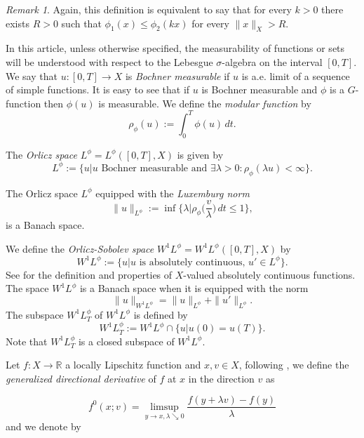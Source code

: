 \documentclass[twoside]{article}
\theoremstyle{definition}
\theoremstyle{plain}
\theoremstyle{remark}
\newtheorem{remark}{Remark}[section]
\newcommand{\orlnor}{\|_{L^{\phi}}}
\newcommand{\lphi}{L^{\phi}}
\newcommand{\wphi}{W^{1}\lphi}
\newcommand{\wphit}{W^{1}\lphi_T}
\newcommand{\rr}{\mathbb{R}}
\begin{document}
\begin{remark} Again, this definition is equivalent to say that for every $k>0$ there exists $R>0$ such that $\phi_1(x)\leq\phi_2(kx)$ for every $\|x\|_X>R$. 
\end{remark}




In this article, unless otherwise specified, the measurability of functions or sets will be understood with respect to the Lebesgue $\sigma$-algebra on the interval $[0, T]$. We say that $u:[0,T]\to X$ is \emph{Bochner measurable} if $u$ is a.e. limit  of a sequence of simple functions.  It is easy to see that if $u$ is Bochner measurable and $\phi$ is   a $G$-function then $\phi(u)$ is measurable. We define the \emph{modular function} by
\[\rho_{\phi}(u):= \int_0^T \phi(u)\, dt.\] 


The \emph{Orlicz space} $\lphi=L^{\phi}\left([0,T],X\right)$ is given by
\begin{equation}\label{espacioOrlicz}
\lphi:=\big\{ u\big| u \text{ Bochner measurable and } \exists \lambda>0: \rho_{\phi}(\lambda u) < \infty   \big\}.
\end{equation}

  The Orlicz space $\lphi$ equipped with the \emph{Luxemburg norm}
\[
\|  u  \orlnor:=\inf \bigg\{ \lambda\bigg| \rho_{\phi}\bigg(\frac{v}{\lambda}\bigg) \,dt\leq 1\bigg\},
\]
is a Banach space. 




We define the \emph{Orlicz-Sobolev space} $\wphi=\wphi\left([0,T],X\right)$ by
\[\wphi:=\big\{u| u \text{ is absolutely continuous, }  u'\in \lphi\big\}.\]
See \cite{barbu1976nonlinear} for the definition and properties of $X$-valued  absolutely continuous functions.
The space $\wphi$ is a Banach space when it is equipped with the norm
\begin{equation}\label{def-norma-orlicz-sob}
\|  u  \|_{\wphi}= \|  u  \|_{\lphi} + \|u'\orlnor.
\end{equation}
The subspace $\wphit$ of $\wphi$ is defined by
\[\wphit:=\wphi\cap \big\{u| u(0)=u(T)\big\}.\]
Note that $\wphit$ is a closed subspace of $\wphi$. 


Let $f:X\to \rr$ a locally Lipschitz function and   $x, v \in X$,  following \cite{clarke1990optimization, clarke2013functional}, we define the \emph{generalized directional derivative} of $f$  at $x$ in the direction $v$  as

$$
f^0(x ; v)=\limsup _{y \rightarrow x, \lambda \searrow 0} \frac{f(y+\lambda v)-f(y)}{\lambda}
$$
and we denote by
\end{document}
